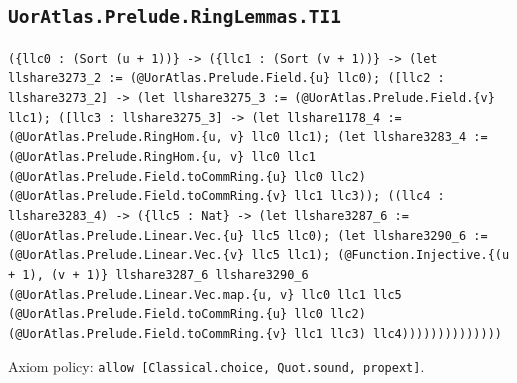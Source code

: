 \documentclass[11pt]{article}
\begin{document}
\subsection*{\texttt{UorAtlas.Prelude.RingLemmas.TI1}}
\noindent\texttt{(\{llc0 : (Sort (u + 1))\} -> (\{llc1 : (Sort (v + 1))\} -> (let llshare3273\_2 := (@UorAtlas.Prelude.Field.\{u\} llc0); ([llc2 : llshare3273\_2] -> (let llshare3275\_3 := (@UorAtlas.Prelude.Field.\{v\} llc1); ([llc3 : llshare3275\_3] -> (let llshare1178\_4 := (@UorAtlas.Prelude.RingHom.\{u, v\} llc0 llc1); (let llshare3283\_4 := (@UorAtlas.Prelude.RingHom.\{u, v\} llc0 llc1 (@UorAtlas.Prelude.Field.toCommRing.\{u\} llc0 llc2) (@UorAtlas.Prelude.Field.toCommRing.\{v\} llc1 llc3)); ((llc4 : llshare3283\_4) -> (\{llc5 : Nat\} -> (let llshare3287\_6 := (@UorAtlas.Prelude.Linear.Vec.\{u\} llc5 llc0); (let llshare3290\_6 := (@UorAtlas.Prelude.Linear.Vec.\{v\} llc5 llc1); (@Function.Injective.\{(u + 1), (v + 1)\} llshare3287\_6 llshare3290\_6 (@UorAtlas.Prelude.Linear.Vec.map.\{u, v\} llc0 llc1 llc5 (@UorAtlas.Prelude.Field.toCommRing.\{u\} llc0 llc2) (@UorAtlas.Prelude.Field.toCommRing.\{v\} llc1 llc3) llc4))))))))))))))}\par
\noindent Axiom policy: \texttt{allow [Classical.choice, Quot.sound, propext]}.\par
\end{document}
